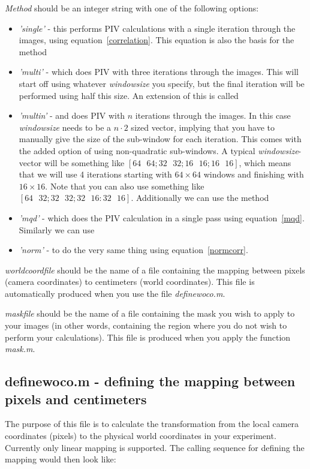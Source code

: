 \documentclass{book}
\begin{document}
{\em Method} should be an integer string with one of the following options:
\begin{itemize}
\item {\em 'single'} - this performs PIV calculations with a single
iteration through the images, using equation~\ref{correlation}. This
equation is also the basis for the method
\item {\em 'multi'} - which does PIV with three iterations through the
images. This will start off using whatever {\em windowsize} you specify,
but the final iteration will be performed using half this size. An
extension of this is called
\item {\em 'multin'} - and does PIV with $n$ iterations through the
images. In this case {\em windowsize} needs to be a $n \cdot 2$ sized
vector, implying that you have to manually give the size of the
sub-window for each iteration. This comes with the added option of using
non-quadratic sub-windows. A typical {\em windowsize}-vector will be
something like $[64\mbox{ } 64;32\mbox{ } 32;16\mbox{ } 16;16\mbox{ }
16]$, which means that we will use 4 iterations starting with
$64\times64$ windows and finishing with $16\times16$. Note that you can
also use something like $[64\mbox{ } 32;32\mbox{ } 32;32\mbox{ }
16:32\mbox{ } 16]$. Additionally we can use the method
\item {\em 'mqd'} - which does the PIV calculation in a single pass
using equation~\ref{mqd}. Similarly we can use
\item {\em 'norm'} - to do the very same thing using
equation~\ref{normcorr}.
\end{itemize}

{\em worldcoordfile} should be the name of a file containing the mapping
between pixels (camera coordinates) to centimeters (world coordinates).
This file is automatically produced when you use the file {\em
definewoco.m}.

{\em maskfile} should be the name of a file containing the mask you wish
to apply to your images (in other words, containing the region where you
do not wish to perform your calculations). This file is produced when
you apply the function {\em mask.m}.


\subsection{definewoco.m - defining the mapping between pixels and centimeters}
\label{define}


The purpose of this file is to calculate the transformation from the
local camera coordinates (pixels) to the physical world coordinates in
your experiment. Currently only linear mapping is supported. The
calling sequence for defining the mapping would then look like:
\end{document}
